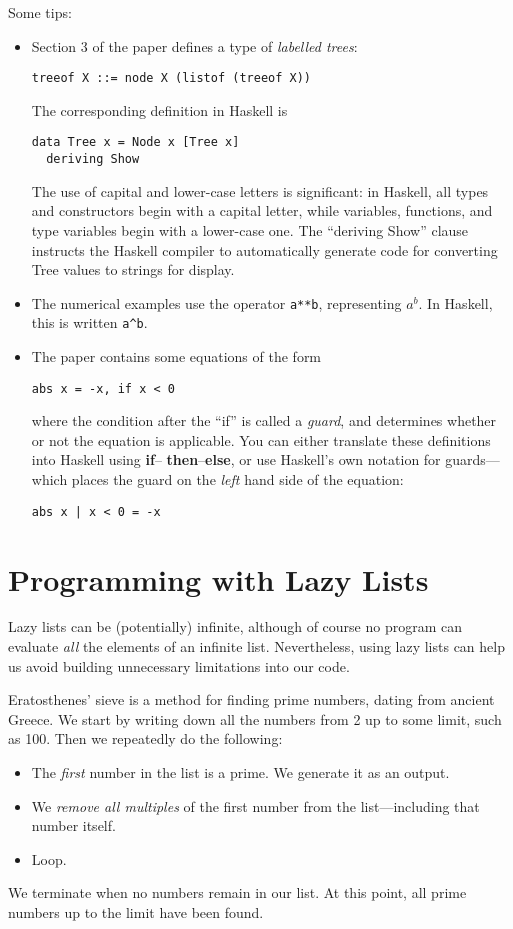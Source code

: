 \documentclass{article}
\begin{document}
Some tips:
\begin{itemize}
\item
Section 3 of the paper defines a type of {\em labelled trees}:
\begin{verbatim}
treeof X ::= node X (listof (treeof X))
\end{verbatim}
The corresponding definition in Haskell is
\begin{verbatim}
data Tree x = Node x [Tree x]
  deriving Show
\end{verbatim}
The use of capital and lower-case letters is significant: in Haskell,
all types and constructors begin with a capital letter, while
variables, functions, and type variables begin with a lower-case
one. The ``deriving Show'' clause instructs the Haskell compiler to
automatically generate code for converting Tree values to strings for
display.
\item
The numerical examples use the operator \verb!a**b!, representing
$a^b$. In Haskell, this is written \verb!a^b!.
\item
The paper contains some equations of the form
\begin{verbatim}
abs x = -x, if x < 0
\end{verbatim}
where the condition after the ``if'' is called a {\em guard}, and
determines whether or not the equation is applicable. You can either
translate these definitions into Haskell using {\bf if}--{\bf
  then}--{\bf else}, or use Haskell's own notation for guards---which
places the guard on the {\em left} hand side of the equation:
\begin{verbatim}
abs x | x < 0 = -x
\end{verbatim}
\end{itemize}

\section{Programming with Lazy Lists}
Lazy lists can be (potentially) infinite, although of course no
program can evaluate {\em all} the elements of an infinite
list. Nevertheless, using lazy lists can help us avoid building
unnecessary limitations into our code.

Eratosthenes' sieve is a method for finding prime numbers, dating from
ancient Greece. We start by writing down all the numbers from 2 up to
some limit, such as 100. Then we repeatedly do the following:
\begin{itemize}
\item
The {\em first} number in the list is a prime. We generate it as an
output.
\item
We {\em remove all multiples} of the first number from the
list---including that number itself.
\item
Loop.
\end{itemize}
We terminate when no numbers remain in our list. At this point, all
prime numbers up to the limit have been found.
\end{document}
